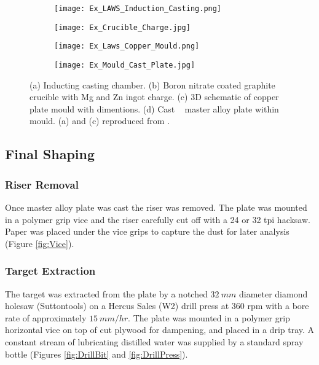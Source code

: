 \documentclass[a4paper,12pt,oneside]{report}%
\begin{document}
\begin{figure}[htbp]
	\centering
	\begin{subfigure}[htbp]{0.49\textwidth}
		\texttt{[image: Ex\_LAWS\_Induction\_Casting.png]}
		\caption{}
		\label{fig:LawsCasting}
	\end{subfigure}
	\begin{subfigure}[htbp]{0.375\textwidth}
		\texttt{[image: Ex\_Crucible\_Charge.jpg]}
		\caption{}
		\label{fig:CrucibleCharge}
	\end{subfigure}
	\begin{subfigure}[htbp]{0.41\textwidth}
		\texttt{[image: Ex\_Laws\_Copper\_Mould.png]}
		\caption{}
		\label{fig:LawsMould}
	\end{subfigure}
	\begin{subfigure}[htbp]{0.49\textwidth}
		\texttt{[image: Ex\_Mould\_Cast\_Plate.jpg]}
		\caption{}
		\label{fig:FilledMould}
	\end{subfigure}
	\caption[(a) Inducting casting chamber. (b) Boron nitrate coated graphite crucible with Mg and Zn ingot charge. (c) 3D schematic of copper plate mould with dimentions. (d) Cast \MgZnCa~ master alloy plate within mould.]{(a) Inducting casting chamber. (b) Boron nitrate coated graphite crucible with Mg and Zn ingot charge. (c) 3D schematic of copper plate mould with dimentions. (d) Cast \MgZnCa~ master alloy plate within mould. (a) and (c) reproduced from \cite{Laws2007}.}%
	\label{fig:Induction}
\end{figure}

\subsection{Final Shaping}
\subsubsection{Riser Removal} \label{sec:RiserRemoval}
Once master alloy plate was cast the riser was removed. The plate was mounted in a polymer grip vice and the riser carefully cut off with a 24 or 32 \acrshort{tpi} hacksaw. Paper was placed under the vice grips to capture the dust for later analysis (Figure \ref{fig:Vice}).

\subsubsection{Target Extraction}
The target was extracted from the plate by a notched $32~ mm$ diameter diamond holesaw (Suttontools) on a Hercus Sales (W2) drill press at 360 \acrshort{rpm} with a bore rate of approximately $15~ mm/hr$. The plate was mounted in a polymer grip horizontal vice on top of cut plywood for dampening, and placed in a drip tray. A constant stream of lubricating distilled water was supplied by a standard spray bottle (Figures \ref{fig:DrillBit} and \ref{fig:DrillPress}).
\end{document}
